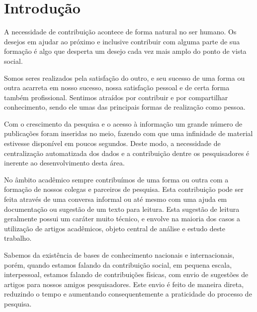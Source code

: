 
\chapter{Introdução}
\label{cha:introduction}

A necessidade de contribuição acontece de forma natural no ser humano. Os desejos em ajudar ao próximo e inclusive contribuir com alguma parte de sua formação é algo que desperta um desejo cada vez mais amplo do ponto de vista social.

Somos seres realizados pela satisfação do outro, e seu sucesso de uma forma ou outra acarreta em nosso sucesso, nossa satisfação pessoal e de certa forma também profissional. Sentimos atraídos por contribuir e por compartilhar conhecimento, sendo ele umas das principais formas de realização como pessoa.

\begin{textedited}
Com o crescimento da pesquisa e o acesso à informação um grande número de publicações foram inseridas no meio, fazendo com que uma infinidade de material estivesse disponível em poucos segundos. Deste modo, a necessidade de centralização automatizada dos dados e a contribuição dentre os pesquisadores é inerente ao desenvolvimento desta área. 
\end{textedited}

\begin{textedited}
No âmbito acadêmico sempre contribuímos de uma forma ou outra com a formação de nossos colegas e parceiros de pesquisa. Esta contribuição pode ser feita através de uma conversa informal ou até mesmo com uma ajuda em documentação ou sugestão de um texto para leitura. Esta sugestão de leitura geralmente possui um caráter muito técnico, e envolve na maioria dos casos a utilização de artigos acadêmicos, objeto central de análise e estudo deste trabalho.
\end{textedited}

\begin{textedited}
Sabemos da existência de bases de conhecimento nacionais e internacionais, porém, quando estamos falando da contribuição social, em pequena escala, interpessoal, estamos falando de contribuições físicas, com envio de sugestões de artigos para nossos amigos pesquisadores. Este envio é feito de maneira direta, reduzindo o tempo e aumentando consequentemente a praticidade do processo de pesquisa.
\end{textedited}

